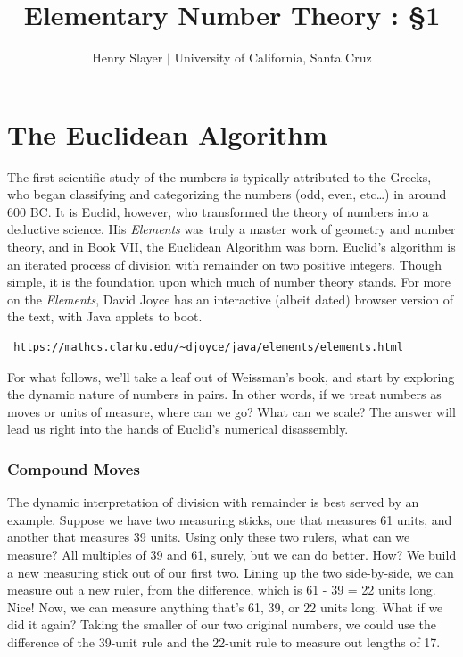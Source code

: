 \documentclass{article}
\begin{document}
 

\title{Elementary Number Theory : \S 1} 
\author{Henry Slayer $|$ University of California, Santa Cruz} 
\date{}
\maketitle

\section*{The Euclidean Algorithm} 
The first scientific study of the numbers is typically attributed to the Greeks, who began classifying and categorizing the numbers (odd, even, etc…) in around 600 BC. It is Euclid, however, who transformed the theory of numbers into a deductive science. His \textit{Elements} was truly a master work of geometry and number theory, and in Book VII, the Euclidean Algorithm was born. Euclid's algorithm is an iterated process of division with remainder on two positive integers. Though simple, it is the foundation upon which much of number theory stands. For more on the \textit{Elements}, David Joyce has an interactive (albeit dated) browser version of the text, with Java applets to boot. 
\begin{verbatim} https://mathcs.clarku.edu/~djoyce/java/elements/elements.html 
\end{verbatim} 

For what follows, we’ll take a leaf out of Weissman’s book, and start by exploring the dynamic nature of numbers in pairs. In other words, if we treat numbers as moves or units of measure, where can we go? What can we scale? The answer will lead us right into the hands of Euclid’s numerical disassembly.  
\subsubsection*{Compound Moves} 
The dynamic interpretation of division with remainder is best served by an example. Suppose we have two measuring sticks, one that measures 61 units, and another that measures 39 units. Using only these two rulers, what can we measure? All multiples of 39 and 61, surely, but we can do better. How? We build a new measuring stick out of our first two. Lining up the two side-by-side, we can measure out a new ruler, from the difference, which is 61 - 39 = 22 units long. Nice! Now, we can measure anything that’s 61, 39, or 22 units long. What if we did it again? Taking the smaller of our two original numbers, we could use the difference of the 39-unit rule and the 22-unit rule to measure out lengths of 17. 
\end{document}
